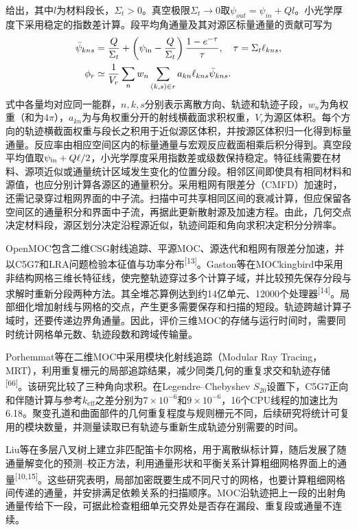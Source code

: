 \documentclass[UTF8, zihao=-4, fontset=none, a4paper]{ctexart}
\newcommand{\upcite}[1]{\textsuperscript{[#1]}}
\begin{document}
给出，其中\(l\)为材料段长，\(\Sigma_{t} > 0\)。真空极限\(\Sigma_{t} \rightarrow 0\)取\(\psi_{out} = \psi_{in} + Ql\)。小光学厚度下采用稳定的指数差计算。段平均角通量及其对源区标量通量的贡献可写为
\begin{equation}
\begin{aligned}
\bar\psi_{kns}&=\frac{Q}{\Sigma_t}+\left(\psi_{\rm in}-\frac{Q}{\Sigma_t}\right)\frac{1-e^{-\tau}}{\tau},\quad \tau=\Sigma_t\ell_{kns},\\
\phi_r&\simeq\frac{1}{V_r}\sum_n w_n\sum_{(k,s)\in r}a_{kn}\ell_{kns}\bar\psi_{kns}.
\end{aligned}
\label{eq:tally}
\end{equation}
式中各量均对应同一能群，\(n,k,s\)分别表示离散方向、轨迹和轨迹子段，\(w_n\)为角权重（和为\(4\pi\)），\(a_{kn}\)为与角权重分开的射线横截面求积权重，\(V_r\)为源区体积。每个方向的轨迹横截面权重与段长之积用于近似源区体积，并按源区体积归一化得到标量通量。反应率由相应空间区内的标量通量与宏观反应截面相乘后积分得到。真空段平均值取\(\psi_{\rm in}+Q\ell/2\)，小光学厚度采用指数差或级数保持稳定。特征线需要在材料、源项近似或通量统计区域发生变化的位置分段。相邻区间即使具有相同材料和源值，也应分别计算各源区的通量积分。采用粗网有限差分（CMFD）加速时，还需记录穿过粗网界面的中子流。扫描中可共享相同区间的衰减计算，但应保留各空间区的通量积分和界面中子流，再据此更新散射源及加速方程。由此，几何交点决定材料段，源区划分决定沿程源近似，轨迹间距和角向求积决定积分分辨率。

OpenMOC包含二维CSG射线追踪、平源MOC、源迭代和粗网有限差分加速，并以C5G7和LRA问题检验本征值与功率分布\upcite{13}。Gaston等在MOCkingbird中采用非结构网格三维长特征线，使完整轨迹穿过多个计算子域，并比较预先保存分段与求解时重新分段两种方法。其全堆芯算例达到约14亿单元、12000个处理器\upcite{14}。局部细化增加射线与网格的交点，产生更多需要保存和扫描的短段。轨迹跨越计算子域时，还要传递边界角通量。因此，评价三维MOC的存储与运行时间时，需要同时统计网格单元数、轨迹段数和跨域传输量。

Porhemmat等在二维MOC中采用模块化射线追踪（Modular Ray Tracing，MRT），利用重复栅元的局部追踪结果，减少同类几何的重复求交和轨迹存储\upcite{66}。该研究比较了三种角向求积。在Legendre--Chebyshev $S_{20}$设置下，C5G7正向和伴随计算与参考$k_{\mathrm{eff}}$之差分别为$7\times10^{-6}$和$9\times10^{-6}$，16个CPU线程的加速比为6.18。聚变孔道和曲面部件的几何重复程度与规则栅元不同，后续研究将统计可复用的模块数量，并测量读取已有轨迹与重新生成轨迹分别需要的时间。

Liu等在多层八叉树上建立非匹配笛卡尔网格，用于离散纵标计算，随后发展了随通量解变化的预测--校正方法，利用通量形状和平衡关系计算粗细网格界面上的通量\upcite{10,15}。这些研究表明，局部加密既要生成不同尺寸的网格，也要计算粗细网格间传递的通量，并安排满足依赖关系的扫描顺序。MOC沿轨迹把上一段的出射角通量传给下一段，可据此检查粗细单元交界处是否存在漏段、重复段或通量不连续。
\end{document}
